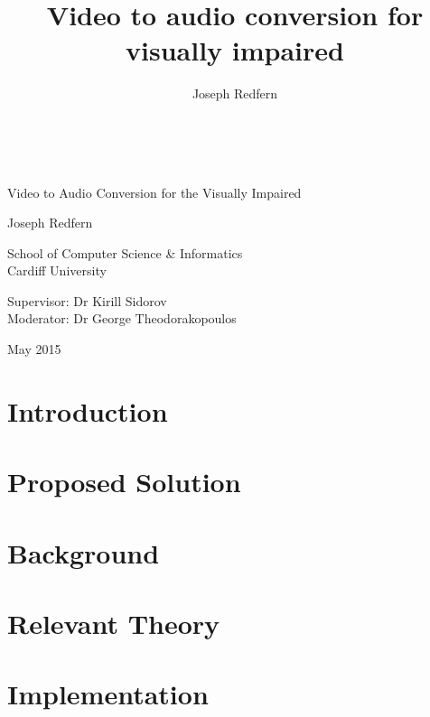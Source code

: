 \documentclass[11pt,a4paper]{memoir}
\author{Joseph Redfern}
\title{Video to audio conversion for visually impaired}
\date{}
\begin{document}
\frontmatter
\thispagestyle{empty}

{%
\sffamily
\centering
\Large

~\vspace{\fill}

{\huge 
    Video to Audio Conversion for the Visually Impaired
}

\vspace{2.5cm}

{\LARGE
    Joseph Redfern
}

\vspace{3.5cm}

School of Computer Science \& Informatics\\
Cardiff University

\vspace{3.5cm}

Supervisor: Dr Kirill Sidorov \\
Moderator: Dr George Theodorakopoulos

\vspace{\fill}

May 2015

}

\cleardoublepage



\clearpage

\tableofcontents*

\clearpage

\lstlistoflistings

\clearpage
\mainmatter

\chapter{Introduction}


\chapter{Proposed Solution}


\chapter{Background}


\chapter{Relevant Theory}


\chapter{Implementation}


\clearpage



\clearpage
\printbibliography
\end{document}
